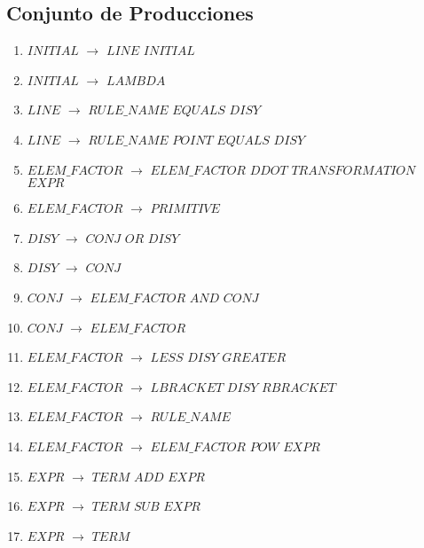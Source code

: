 \noindent



\newpage
\subsection{Conjunto de Producciones}

\begin{enumerate}
\item $INITIAL$   $\rightarrow$  $LINE$ $INITIAL$ \\
\item $INITIAL$   $\rightarrow$  $LAMBDA$ \\
\item $LINE$   $\rightarrow$  $RULE\_NAME$ $EQUALS$ $DISY$ \\
\item $LINE$   $\rightarrow$  $RULE\_NAME$ $POINT$ $EQUALS$ $DISY$ \\

\item $ELEM\_FACTOR$  $\rightarrow$  $ELEM\_FACTOR$ $DDOT$ $TRANSFORMATION$ $EXPR$ \\
\item $ELEM\_FACTOR$  $\rightarrow$  $PRIMITIVE$ \\
\item $DISY$   	$\rightarrow$  $CONJ$ $OR$ $DISY$ \\
\item $DISY$   	$\rightarrow$  $CONJ$ \\

\item $CONJ$   	$\rightarrow$  $ELEM\_FACTOR$ $AND$ $CONJ$ \\
\item $CONJ$   	$\rightarrow$  $ELEM\_FACTOR$ \\

\item $ELEM\_FACTOR$   	$\rightarrow$  $LESS$ $DISY$ $GREATER$ \\
\item $ELEM\_FACTOR$   	$\rightarrow$  $LBRACKET$ $DISY$ $RBRACKET$ \\
\item $ELEM\_FACTOR$ 	$\rightarrow$  $RULE\_NAME$ \\
\item $ELEM\_FACTOR$   	$\rightarrow$  $ELEM\_FACTOR$ $POW$ $EXPR$\\

\item $EXPR$ $\rightarrow$ $TERM$ $ADD$ $EXPR$ \\
\item $EXPR$ $\rightarrow$ $TERM$ $SUB$ $EXPR$ \\
\item $EXPR$ $\rightarrow$ $TERM$ \\


\end{enumerate}
